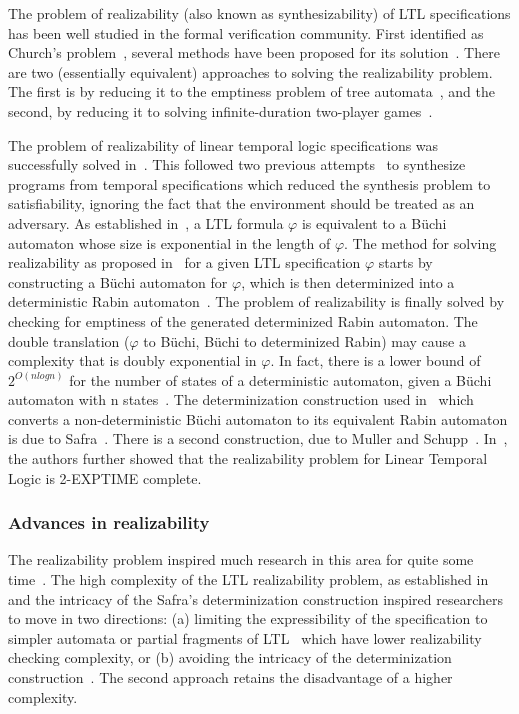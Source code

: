 \noindent
The problem of realizability (also known as synthesizability) of LTL
specifications
has been well studied in the formal verification community. First identified
as Church's problem~\cite{church:63}, several methods have been proposed
for its solution~\cite{buchi:69, rab:72}. There are two (essentially
equivalent) approaches to solving the realizability problem. The first is by
reducing it to the emptiness problem of tree automata~\cite{rab:72}, and
the second, by reducing it to solving infinite-duration two-player
games~\cite{harding:05}.

\noindent
The problem of realizability of linear temporal logic specifications was
successfully solved in~\cite{pnueli:89}. This followed two previous
attempts~\cite{ce81, mw84} to synthesize programs from temporal 
specifications which reduced the synthesis problem to satisfiability,
ignoring the fact that the environment should be treated as an 
adversary.
As established in~\cite{vardi:86}, a LTL formula $\varphi$ is equivalent
to a B\"{u}chi automaton whose size is exponential in the length of
$\varphi$. The method for solving realizability as proposed
in~\cite{pnueli:89} for a given LTL specification
$\varphi$ starts by constructing a B\"{u}chi automaton for $\varphi$, which
is then determinized into a deterministic Rabin automaton~\cite{safra:88}. The
problem of realizability is finally solved by checking for emptiness of
the generated determinized Rabin automaton. The double translation
($\varphi$ to B\"{u}chi, B\"{u}chi to determinized Rabin) may cause a
complexity that is doubly exponential in $\varphi$. In fact, there is a lower
bound of $2^{O(nlogn)}$ for the number of states of a deterministic
automaton, given a B\"{u}chi automaton with n states~\cite{loding}.
The determinization construction used in~\cite{pnueli:89}
which converts a non-deterministic B\"{u}chi automaton to its
equivalent Rabin automaton is due to Safra~\cite{safra:88}. There is a
second construction, due to Muller and Schupp~\cite{muller}.
In~\cite{pnueli:89}, the authors further showed that the realizability 
problem for Linear Temporal Logic is 2-EXPTIME complete.

\subsubsection{Advances in realizability} \label{sec2.2.2.1}
The realizability problem inspired much research in this area for 
quite some time~\cite{ce81, harding:05,pnueli:89,prosyd}. The high 
complexity of the LTL realizability problem, as established 
in~\cite{pnueli:89} and the intricacy of the Safra's determinization 
construction inspired researchers to move
in two directions: (a) limiting the expressibility of the
specification to simpler automata or partial fragments of LTL~\cite{alur:04}
which have lower realizability checking complexity,
or (b) avoiding the intricacy of the determinization
construction~\cite{kupferman:05}. The second approach retains the
disadvantage of a higher complexity.

